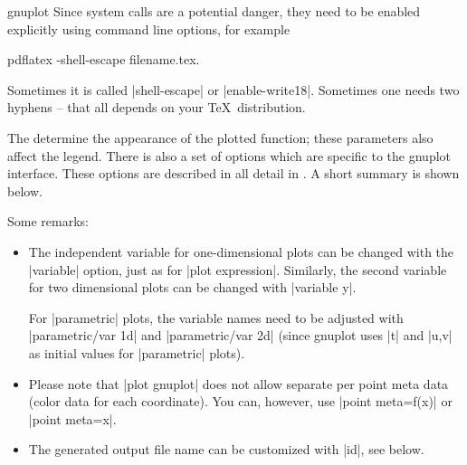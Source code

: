 {\begin{addplotoperation}[]{gnuplot}{}
Since system calls are a potential danger, they need to be enabled explicitly using command line options, for example
\begin{codeexample}
pdflatex -shell-escape filename.tex.
\end{codeexample}
Sometimes it is called |shell-escape| or |enable-write18|. Sometimes one needs two hyphens -- that all depends on your \TeX\ distribution.
\begin{codeexample}[]
\end{codeexample}

\begin{codeexample}[]
\end{codeexample}

The  determine the appearance of the plotted function; these parameters also affect the legend. There is also a set of options which are specific to the gnuplot interface. These options are described in all detail in \cite[section~18.6]{tikz}. A short summary is shown below.


Some remarks:
\begin{itemize}
	\item The independent variable for one-dimensional plots can be changed with the |variable| option, just as for |plot expression|. Similarly, the second variable for two dimensional plots can be changed with |variable y|.

	For |parametric| plots, the variable names need to be adjusted with |parametric/var 1d| and |parametric/var 2d| (since gnuplot uses |t| and |u,v| as initial values for |parametric| plots).
	\item 
Please note that |plot gnuplot| does not allow separate per point meta data (color data for each coordinate). You can, however, use |point meta=f(x)| or |point meta=x|.

	\item The generated output file name can be customized with |id|, see below.
\end{itemize}


\end{addplotoperation}}
